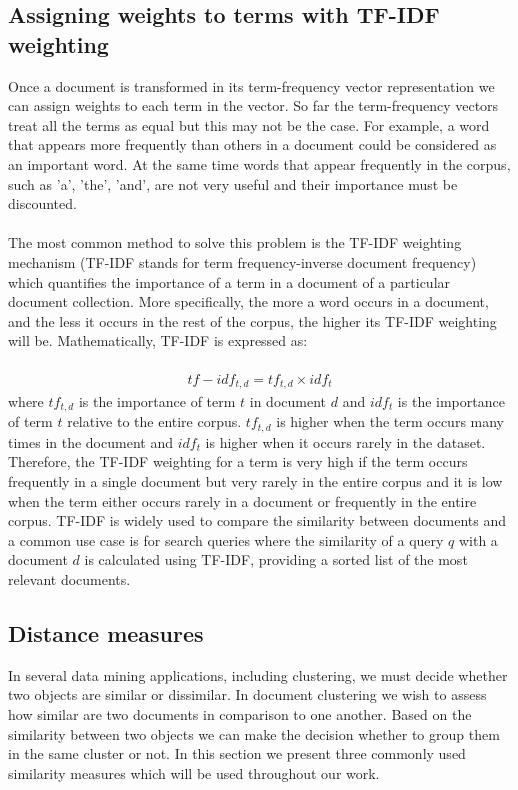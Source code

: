 \subsection{Assigning weights to terms with TF-IDF weighting}
Once a document is transformed in its term-frequency vector representation we can assign weights to each term in the vector. So far the term-frequency vectors treat 
all the terms as equal but this may not be the case. For example, a word that appears more frequently than others in a document could be considered as an 
important word. At the same time words that appear frequently in the corpus, such as 'a', 'the', 'and', are not very useful and their 
importance must be discounted. \\\\
The most common method to solve this problem is the TF-IDF weighting mechanism (TF-IDF stands for term frequency-inverse document frequency) which quantifies the importance of a term in a document of a particular document collection. More specifically, the more a word occurs in a document, and the less it occurs in the rest of the corpus, the higher its TF-IDF weighting 
will be. Mathematically, TF-IDF is expressed as:\\\\
\begin{eqnarray}
tf-idf_{t,d} = tf_{t, d} \times idf_t
\end{eqnarray}
where $tf_{t, d}$ is the importance of term $t$ in document $d$ and $idf_t$ is the importance of term $t$ relative to the entire corpus. $tf_{t,d}$ is higher when the term occurs many times in the document and $idf_t$ is higher when it occurs rarely in the dataset. Therefore, the TF-IDF weighting for a term is very high if the term occurs frequently in a single document but very rarely in the entire corpus and it is low when the term either occurs rarely in a document or frequently in the entire corpus. TF-IDF is widely used to compare the similarity between documents and a common use case is for search queries where the similarity of a query $q$ with a document $d$ is calculated using TF-IDF, providing
a sorted list of the most relevant documents. 
\\

\subsection{Distance measures}
In several data mining applications, including clustering, we must decide whether two objects are similar or dissimilar. In document clustering we wish to 
assess how similar are two documents in comparison to one another. Based on the similarity between two objects we can make the decision whether to
group them in the same cluster or not. In this section we present three commonly used similarity measures which will be used throughout our work. 

